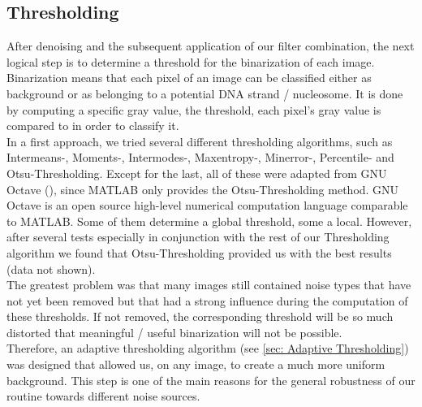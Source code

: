 \documentclass{article}
\begin{document}
\subsection{Thresholding}\label{sec:Thresholding}
After denoising and the subsequent application of our filter combination, the next logical step is to determine a threshold for the binarization of each image. Binarization means that each pixel of an image can be classified either as background or as belonging to a potential DNA strand / nucleosome. It is done by computing a specific gray value, the threshold, each pixel's gray value is compared to in order to classify it.\\
In a first approach, we tried several different thresholding algorithms, such as Intermeans-, Moments-, Intermodes-, Maxentropy-, Minerror-, Percentile- and Otsu-Thresholding. Except for the last, all of these were adapted from GNU Octave (\cite{GNUOctave}), since MATLAB only provides the Otsu-Thresholding method. GNU Octave is an open source high-level numerical computation language comparable to MATLAB. Some of them determine a global threshold, some a local. However, after several tests especially in conjunction with the rest of our Thresholding algorithm we found that Otsu-Thresholding provided us with the best results (data not shown).\\
The greatest problem was that many images still contained noise types that have not yet been removed but that had a strong influence during the computation of these thresholds. If not removed, the corresponding threshold will be so much distorted that meaningful / useful binarization will not be possible.\\
Therefore, an adaptive thresholding algorithm (see \ref{sec: Adaptive Thresholding}) was designed that allowed us, on any image, to create a much more uniform background. This step is one of the main reasons for the general robustness of our routine towards different noise sources.
\end{document}
